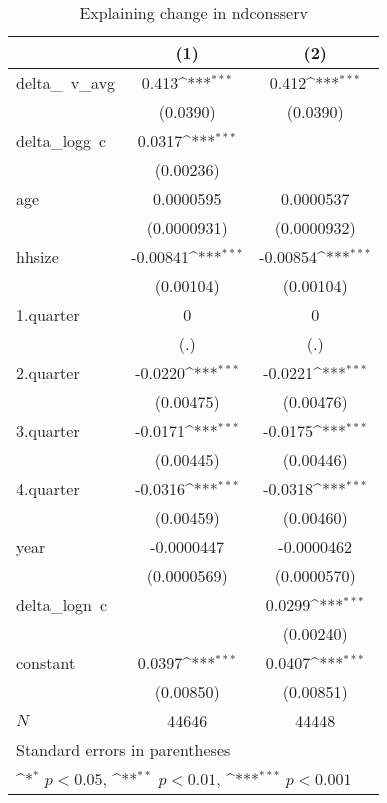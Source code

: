 \begin{table}[htbp]\centering
\def\sym#1{\ifmmode^{#1}\else\(^{#1}\)\fi}
\caption{\label{logndconsserv\_deltacons} Explaining change in ndconsserv}
\begin{tabular}{l*{2}{c}}
\hline\hline
            &\multicolumn{1}{c}{(1)}         &\multicolumn{1}{c}{(2)}         \\
\hline
delta\_~v\_avg&       0.413\sym{***}&       0.412\sym{***}\\
            &    (0.0390)         &    (0.0390)         \\
delta\_logg~c&      0.0317\sym{***}&                     \\
            &   (0.00236)         &                     \\
age         &   0.0000595         &   0.0000537         \\
            & (0.0000931)         & (0.0000932)         \\
hhsize      &    -0.00841\sym{***}&    -0.00854\sym{***}\\
            &   (0.00104)         &   (0.00104)         \\
1.quarter   &           0         &           0         \\
            &         (.)         &         (.)         \\
2.quarter   &     -0.0220\sym{***}&     -0.0221\sym{***}\\
            &   (0.00475)         &   (0.00476)         \\
3.quarter   &     -0.0171\sym{***}&     -0.0175\sym{***}\\
            &   (0.00445)         &   (0.00446)         \\
4.quarter   &     -0.0316\sym{***}&     -0.0318\sym{***}\\
            &   (0.00459)         &   (0.00460)         \\
year        &  -0.0000447         &  -0.0000462         \\
            & (0.0000569)         & (0.0000570)         \\
delta\_logn~c&                     &      0.0299\sym{***}\\
            &                     &   (0.00240)         \\
constant    &      0.0397\sym{***}&      0.0407\sym{***}\\
            &   (0.00850)         &   (0.00851)         \\
\hline
\(N\)       &       44646         &       44448         \\
\hline\hline
\multicolumn{3}{l}{\footnotesize Standard errors in parentheses}\\
\multicolumn{3}{l}{\footnotesize \sym{*} \(p<0.05\), \sym{**} \(p<0.01\), \sym{***} \(p<0.001\)}\\
\end{tabular}
\end{table}
